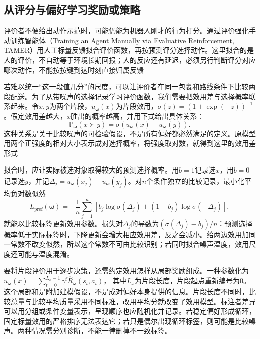 \subsection{从评分与偏好学习奖励或策略}
\label{sec:rl-reward-preference}

评价者不便给出动作示范时，可能仍能为机器人刚才的行为打分。通过评价强化手动训练智能体（Training an Agent Manually via Evaluative Reinforcement, TAMER）用人工标量反馈拟合评价函数，再按预测评分选择动作。这里拟合的是人的评价，不自动等于环境长期回报；人的反应还有延迟，必须另行判断评分对应哪次动作，不能按按键到达时刻直接归属反馈

若难以统一“这一段值几分”的尺度，可以让评价者在同一包裹和路线条件下比较两段配送。为了从带噪声的选择记录学习评价函数，我们需要把效用差与选择概率联系起来。令$x,y$为两个片段，$u_{\bm{\omega}}(x)$为片段效用，$\sigma(z)=(1+\exp(-z))^{-1}$。假定效用差越大，$x$胜出的概率越高，并用下式给出具体关系：
\begin{equation}
  \mathbb P_{\bm{\omega}}(x\succ y)
    =\sigma\!\left(u_{\bm{\omega}}(x)-u_{\bm{\omega}}(y)\right).
  \label{eq:rl-reward-bt}
\end{equation}
这种关系是关于比较噪声的可检验假设，不是所有偏好都必然满足的定义。原模型用两个正强度的相对大小表示成对选择概率，将强度取对数，就得到这里的效用差形式

拟合时，应让实际被选对象取得较大的预测选择概率。用$b=1$记录选$x$，用$b=0$记录选$y$，并记$\Delta_j=u_{\bm{\omega}}(x_j)-u_{\bm{\omega}}(y_j)$。对$n$个条件独立的比较记录，最小化平均负对数似然
\begin{equation}
  L_{\mathrm{pref}}(\bm{\omega})
  =-\frac1n\sum_{j=1}^n
    \left[b_j\log\sigma(\Delta_j)
      +(1-b_j)\log\sigma(-\Delta_j)\right],
  \label{eq:rl-reward-bt-loss}
\end{equation}
就能以比较标签更新效用参数。损失对$\Delta_j$的导数为$(\sigma(\Delta_j)-b_j)/n$：预测选择概率低于实际标签时，下降更新会增大相应效用差，反之会减小。给两边效用加同一常数不改变似然，所以这个常数不可由比较识别；若同时拟合噪声温度，效用尺度还可能与温度混淆。

要将片段评价用于逐步决策，还需约定效用怎样从局部奖励组成。一种参数化为
$u_{\bm{\omega}}(x)=\sum_{t=0}^{L_x-1}\gamma^t
\widehat R_{\bm{\omega}}(s_t,a_t)$，
其中$L_x$为片段长度，片段起点重新编号为0。这个局部和是附加建模假设，不是成对偏好本身提供的信息。片段长度不同时，比较总量与比较平均质量采用不同标准，改用平均分就改变了效用模型。标注者差异可以用分组或条件变量表示，呈现顺序也应随机化并记录。若稳定偏好形成循环，固定标量效用的严格排序无法表达它；若只是偶尔出现循环标签，则可能是比较噪声。两种情况需分别诊断，不能一律删掉不一致标签。

